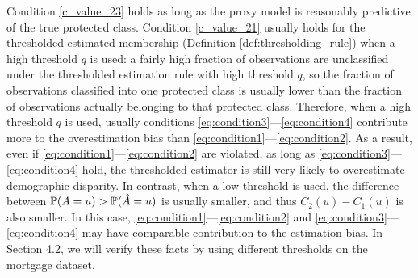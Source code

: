 Condition \eqref{c_value_23} holds as long as the proxy model is reasonably predictive of the true protected class. Condition \eqref{c_value_21} usually holds for the thresholded estimated membership (Definition \ref{def:thresholding_rule}) when a high threshold $q$ is used: a fairly high fraction of observations are unclassified under the thresholded estimation rule with high threshold $q$, so the fraction of observations  classified into one protected class is usually lower than the fraction of observations actually belonging to that  protected class.
Therefore, when a high threshold $q$ is used, usually conditions \eqref{eq:condition3}---\eqref{eq:condition4} contribute more to the overestimation bias than \eqref{eq:condition1}---\eqref{eq:condition2}.
As a result, even if \eqref{eq:condition1}---\eqref{eq:condition2} are violated, as long as \eqref{eq:condition3}---\eqref{eq:condition4} hold, the thresholded estimator is still very likely to overestimate demographic disparity.
In contrast, when a low threshold is used, the difference between $\mathbb{P} (A = u) > \mathbb{P} (\hat{A} = u)$ is usually smaller, and thus $C_2(u) - C_1(u)$ is also smaller.
In this case, \eqref{eq:condition1}---\eqref{eq:condition2} and \eqref{eq:condition3}---\eqref{eq:condition4} may have comparable contribution to the estimation bias.
In Section 4.2, we will verify these facts by using different thresholds on the mortgage dataset.





